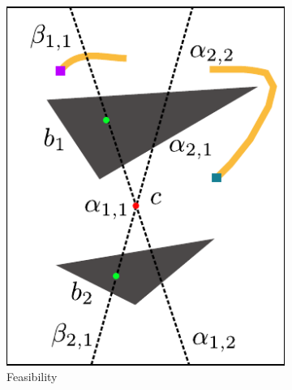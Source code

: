 \documentclass[letterpaper, 10 pt, conference]{ieeeconf}
\begin{document}
\begin{figure}
	\centering
	\begin{subfigure}[t]{0.4\linewidth}
		\centering
		\includegraphics[width=\textwidth]{fig/feasibility}
		\caption{Feasibility}
		\label{fig:grammar:feasibility}
	\end{subfigure}  
	\begin{subfigure}[t]{0.4\linewidth}
		\centering

\end{subfigure}
\end{figure}
\end{document}
